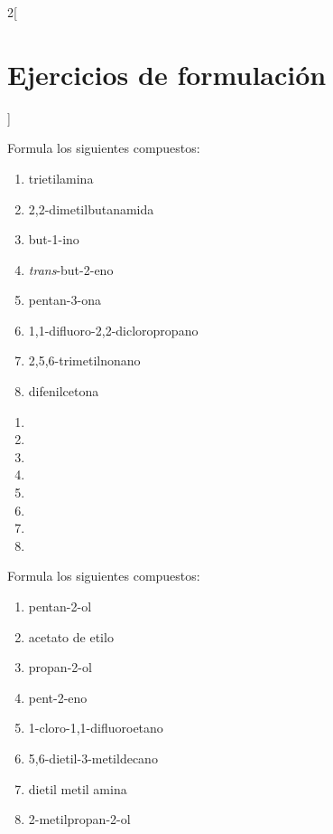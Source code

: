 \documentclass[10pt]{article}
\begin{document}
\begin{multicols}{2}[
  \section{Ejercicios de formulación}
  ]
\begin{exercise}[
    tags    = {orgánica,nomenclatura,múltiple,2B},
    topics  = {química orgánica,formulación,nomenclatura},
    source  = {Química 2B SAN 2016, p392, e20},
  ]
  Formula los siguientes compuestos:

  \begin{enumerate}
    \item trietilamina
    \item 2,2-dimetilbutanamida
    \item but-1-ino
    \item \textit{trans}-but-2-eno
    \item pentan-3-ona
    \item 1,1-difluoro-2,2-dicloropropano
    \item 2,5,6-trimetilnonano
    \item difenilcetona
  \end{enumerate}
\end{exercise}

\begin{solution}
  \begin{enumerate}
    \item {}
    \item {}
    \item {}
    \item {}
    \item {}
    \item {}
    \item {}
    \item {}
  \end{enumerate}
\end{solution}



\begin{exercise}[
    tags    = {orgánica,nomenclatura,múltiple,2B},
    topics  = {química orgánica,formulación,nomenclatura},
    source  = {Química 2B SAN 2016, p392, e21},
  ]
  Formula los siguientes compuestos:

  \begin{enumerate}
    \item pentan-2-ol
    \item acetato de etilo
    \item propan-2-ol
    \item pent-2-eno
    \item 1-cloro-1,1-difluoroetano
    \item 5,6-dietil-3-metildecano
    \item dietil metil amina
    \item 2-metilpropan-2-ol
  \end{enumerate}
\end{exercise}


\end{multicols}
\end{document}
